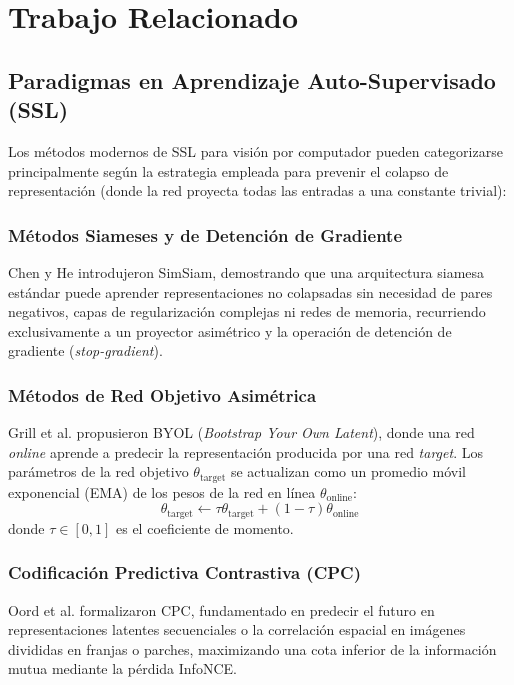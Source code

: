 \section{Trabajo Relacionado}
\label{sec:related_work}

\subsection{Paradigmas en Aprendizaje Auto-Supervisado (SSL)}
Los métodos modernos de SSL para visión por computador pueden categorizarse principalmente según la estrategia empleada para prevenir el colapso de representación (donde la red proyecta todas las entradas a una constante trivial):

\subsubsection{Métodos Siameses y de Detención de Gradiente}
Chen y He \cite{chen2021simsiam} introdujeron SimSiam, demostrando que una arquitectura siamesa estándar puede aprender representaciones no colapsadas sin necesidad de pares negativos, capas de regularización complejas ni redes de memoria, recurriendo exclusivamente a un proyector asimétrico y la operación de detención de gradiente (\textit{stop-gradient}).

\subsubsection{Métodos de Red Objetivo Asimétrica}
Grill et al. \cite{grill2020byol} propusieron BYOL (\textit{Bootstrap Your Own Latent}), donde una red \textit{online} aprende a predecir la representación producida por una red \textit{target}. Los parámetros de la red objetivo $\theta_{\text{target}}$ se actualizan como un promedio móvil exponencial (EMA) de los pesos de la red en línea $\theta_{\text{online}}$:
\begin{equation}
\theta_{\text{target}} \leftarrow \tau \theta_{\text{target}} + (1 - \tau) \theta_{\text{online}}
\label{eq:byol_ema}
\end{equation}
donde $\tau \in [0, 1]$ es el coeficiente de momento.

\subsubsection{Codificación Predictiva Contrastiva (CPC)}
Oord et al. \cite{oord2018cpc} formalizaron CPC, fundamentado en predecir el futuro en representaciones latentes secuenciales o la correlación espacial en imágenes divididas en franjas o parches, maximizando una cota inferior de la información mutua mediante la pérdida InfoNCE.

